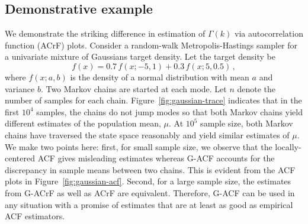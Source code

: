 \documentclass[11pt]{article}
\theoremstyle{remark}
\newtheorem{example}{Example}
\begin{document}

\subsection{Demonstrative example} %
\label{sub:demonstrative_example}


We demonstrate the striking difference in estimation of $\Gamma(k)$ via autocorrelation function (ACrF) plots. Consider a random-walk Metropolis-Hastings sampler for a univariate mixture of Gaussians target density. Let the target density be 
\[
f(x) = 0.7\,f(x; -5, 1) + 0.3\,f(x; 5, 0.5)\,,
\]
where $f(x; a,b)$ is the density of a normal distribution with mean $a$ and variance $b$. 
Two Markov chains are started at each mode. Let $n$ denote the number of samples for each chain. Figure~\ref{fig:gaussian-trace} indicates that in the first $10^4$ samples, the chains do not jump modes so that both Markov chains yield different estimates of the population mean, $\mu$. At $10^5$ sample size, both Markov chains have traversed the state space reasonably and yield similar estimates of $\mu$. We make two points here: first, for small sample size, we observe that the locally-centered ACF gives misleading estimates whereas G-ACF accounts for the discrepancy in sample means between two chains. This is evident from the ACF plots  in Figure~\ref{fig:gaussian-acf}. Second, for a large sample size, the estimates from G-ACrF as well as ACrF are equivalent. Therefore, G-ACF can be used in any situation with a promise of estimates that are at least as good as empirical ACF estimators.  
\end{document}
